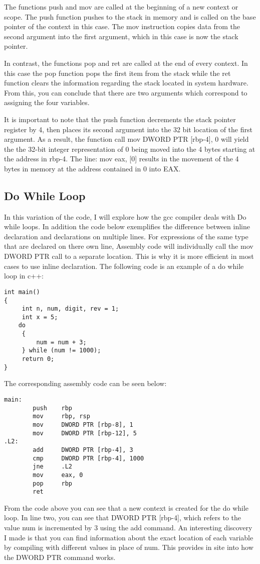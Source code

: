 \documentclass{article}
\theoremstyle{theorem}
\theoremstyle{definition}
\theoremstyle{remark}
\begin{document}
The functions push and mov are called at the beginning of a new context or scope. The push function pushes to the stack in memory and is called on the base pointer of the context in this case. The mov instruction copies data from the second argument into the first argument, which in this case is now the stack pointer.

In contrast, the functions pop and ret are called at the end of every context. In this case the pop function pops the first item from the stack while the ret function clears the information regarding the stack located in system hardware. From this, you can conclude that there are two arguments which correspond to assigning the four variables.

It is important to note that the push function decrements the stack pointer register by 4, then places its second argument into the 32 bit location of the first argument. As a result, the function call mov DWORD PTR [rbp-4], 0 will yield the the 32-bit integer representation of 0 being moved into the 4 bytes starting at the address in rbp-4. The line: mov eax, [0] results in the movement of the 4 bytes in memory at the address contained in 0 into EAX.

\subsection{Do While Loop}

In this variation of the code, I will explore how the gcc compiler deals with Do while loops. In addition the code below exemplifies the difference between inline declaration and declarations on multiple lines. For expressions of  the same type that are declared on there own line, Assembly code will individually call the mov DWORD PTR call to a separate location. This is why it is more efficient in most cases to use inline declaration. The following code is an example of a do while loop in c++:

\begin{lstlisting}
int main()
{
     int n, num, digit, rev = 1;
     int x = 5;
    do
     {
         num = num + 3;
     } while (num != 1000);
     return 0;
}
\end{lstlisting}

The corresponding assembly code can be seen below:\\
\begin{lstlisting}
main:
        push    rbp
        mov     rbp, rsp
        mov     DWORD PTR [rbp-8], 1
        mov     DWORD PTR [rbp-12], 5
.L2:
        add     DWORD PTR [rbp-4], 3
        cmp     DWORD PTR [rbp-4], 1000
        jne     .L2
        mov     eax, 0
        pop     rbp
        ret

\end{lstlisting}
From the code above you can see that a new context is created for the do while loop. In line two, you can see that DWORD PTR [rbp-4], which refers to the value num is incremented by 3 using the add command. An interesting discovery I made is that you can find information about the exact location of each variable by compiling with different values in place of num. This provides in site into how the DWORD PTR command works.
\end{document}
